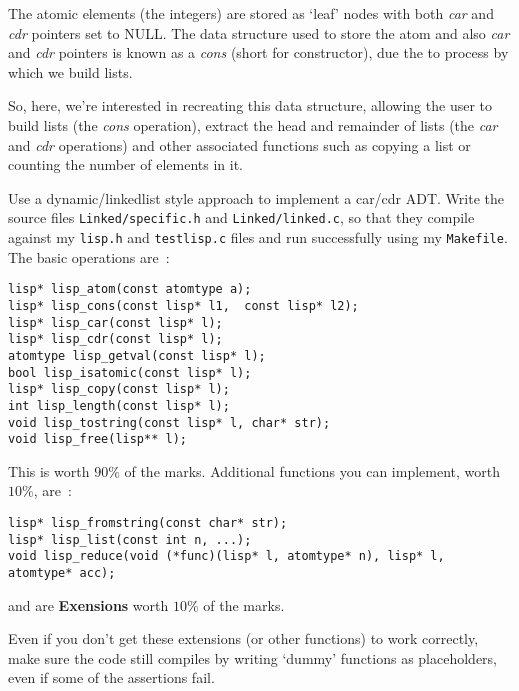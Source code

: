 \noindent The atomic elements (the integers) are stored as `leaf' nodes with both {\it car} and {\it cdr}
pointers set to NULL. The data structure used to store the atom and also {\it car} and {\it cdr} pointers
is known as a {\it cons} (short for constructor), due the to process by which we build lists.

So, here, we're interested in recreating this data structure, allowing the user to build lists (the
{\it cons} operation), extract the head and remainder of lists (the {\it car} and {\it cdr} operations)
and other associated functions such as copying a list or counting the number of elements in it.

\begin{exercise}
Use a dynamic/linkedlist style approach to implement a car/cdr ADT. Write the source files
\verb^Linked/specific.h^ and \verb^Linked/linked.c^, so that they compile against my
\verb^lisp.h^ and \verb^testlisp.c^ files and run successfully using my \verb^Makefile^.
The basic operations are~:
\begin{verbatim}
lisp* lisp_atom(const atomtype a);
lisp* lisp_cons(const lisp* l1,  const lisp* l2);
lisp* lisp_car(const lisp* l);
lisp* lisp_cdr(const lisp* l);
atomtype lisp_getval(const lisp* l);
bool lisp_isatomic(const lisp* l);
lisp* lisp_copy(const lisp* l);
int lisp_length(const lisp* l);
void lisp_tostring(const lisp* l, char* str);
void lisp_free(lisp** l);
\end{verbatim}

\noindent This is worth $90\%$ of the marks.
Additional functions you can implement, worth $10\%$, are~:
\begin{verbatim}
lisp* lisp_fromstring(const char* str);
lisp* lisp_list(const int n, ...);
void lisp_reduce(void (*func)(lisp* l, atomtype* n), lisp* l, atomtype* acc);
\end{verbatim}
and are {\bf Exensions} worth $10\%$ of the marks.

\noindent Even if you don't get these extensions (or other functions) to work correctly, make
sure the code still compiles by writing `dummy' functions as placeholders,
even if some of the assertions fail.
\end{exercise}
